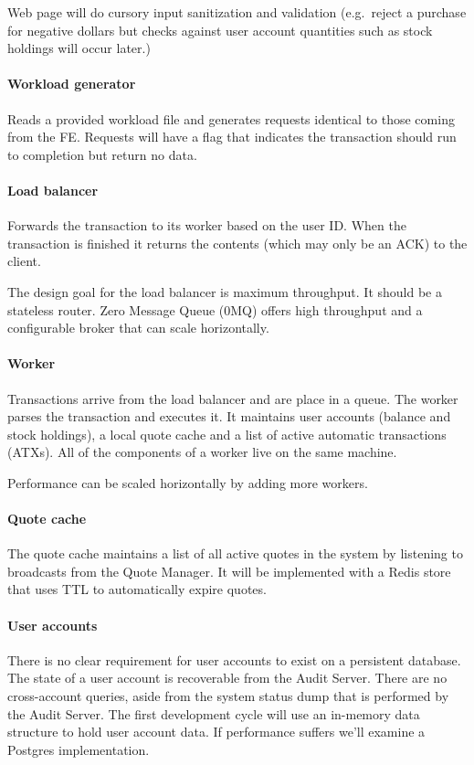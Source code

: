 Web page will do cursory input sanitization and validation (e.g.\ reject a purchase for negative dollars but checks against user account quantities such as stock holdings will occur later.)

\paragraph{Workload generator}
Reads a provided workload file and generates requests identical to those coming from the FE. Requests will have a flag that indicates the transaction should run to completion but return no data.

\paragraph{Load balancer}
Forwards the transaction to its worker based on the user ID. When the transaction is finished it returns the contents (which may only be an ACK) to the client.

The design goal for the load balancer is maximum throughput. It should be a stateless router. Zero Message Queue (0MQ) offers high throughput and a configurable broker that can scale horizontally.

\paragraph{Worker}
Transactions arrive from the load balancer and are place in a queue. The worker parses the transaction and executes it. It maintains user accounts (balance and stock holdings), a local quote cache and a list of active automatic transactions (ATXs). All of the components of a worker live on the same machine.

Performance can be scaled horizontally by adding more workers.

\paragraph{Quote cache}
The quote cache maintains a list of all active quotes in the system by listening to broadcasts from the Quote Manager. It will be implemented with a Redis store that uses TTL to automatically expire quotes.

\paragraph{User accounts}
There is no clear requirement for user accounts to exist on a persistent database. The state of a user account is recoverable from the Audit Server. There are no cross-account queries, aside from the system status dump that is performed by the Audit Server. The first development cycle will use an in-memory data structure to hold user account data. If performance suffers we'll examine a Postgres implementation.

